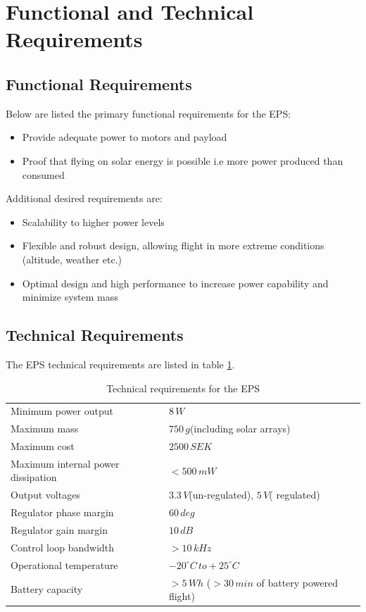 \section{Functional and Technical Requirements}
\label{sec:requirements}

\subsection{Functional Requirements}
%
Below are listed the primary functional requirements for the \ac{EPS}:
%
\begin{itemize}
\item Provide adequate power to motors and payload
\item Proof that flying on solar energy is possible i.e more power produced than consumed
\end{itemize}
%
Additional desired requirements are:
%
\begin{itemize}
\item Scalability to higher power levels
\item Flexible and robust design, allowing flight in more extreme conditions (altitude, weather etc.)
\item Optimal design and high performance to increase power capability and minimize system mass
\end{itemize}
%
%
\subsection{Technical Requirements}
%
The \ac{EPS} technical requirements are listed in table \ref{tab:technical_requirements}.
%
\begin{table}[H]
\centering
\caption{Technical requirements for the \ac{EPS}}
\label{tab:technical_requirements}
\begin{tabular}{p{}p{}}
\hline
Minimum power output & $8\,W$\\
Maximum mass & $750\,g$(including solar arrays)\\
Maximum cost & $2500\,SEK$\\
Maximum internal power dissipation & $<500\,mW$\\
Output voltages & $3.3\,V$(un-regulated), $5\,V$( regulated)\\
Regulator phase margin & $60\,deg$\\
Regulator gain margin & $10\,dB$\\
Control loop bandwidth & $>10\,kHz$\\
Operational temperature & $-20^{\circ}C\,to +25^{\circ}C$\\
Battery capacity & $>5\,Wh$ ($>30\,min$ of battery powered flight)\\
\hline
\end{tabular}
\end{table}
%
